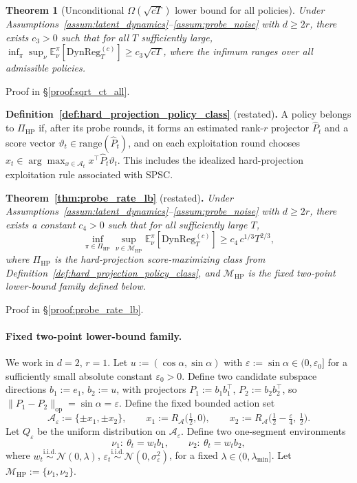 \documentclass{article}
\newcommand{\E}{\mathbb{E}}
\newcommand{\op}{\mathrm{op}}
\newcommand{\cA}{\mathcal{A}}
\newcommand{\DynReg}{\mathrm{DynReg}}
\newcommand{\range}{\mathrm{range}}
\newtheorem{theorem}{Theorem}
\begin{document}
\begin{theorem}[Unconditional $\Omega(\sqrt{cT})$ lower bound for all policies]
\label{thm:sqrt_ct_all}
Under Assumptions~\ref{assum:latent_dynamics}--\ref{assum:probe_noise} with $d \ge 2r$, there exists $c_3 > 0$ such that for all $T$ sufficiently large,
$\inf_\pi \sup_\nu \E_\nu^\pi[\DynReg_T^{(c)}] \ge c_3\sqrt{cT}$,
where the infimum ranges over all admissible policies.
\end{theorem}

Proof in \S\ref{proof:sqrt_ct_all}.

\noindent\textbf{Definition~\ref{def:hard_projection_policy_class}} (restated)\textbf{.}
A policy belongs to $\Pi_{\mathrm{HP}}$ if, after its probe rounds, it forms an estimated rank-$r$ projector $\widehat{P}_t$ and a score vector $\vartheta_t \in \range(\widehat{P}_t)$, and on each exploitation round chooses
$x_t \in \arg\max_{x \in \cA_t} x^\top \widehat{P}_t \vartheta_t$.
This includes the idealized hard-projection exploitation rule associated with SPSC.

\medskip
\noindent\textbf{Theorem~\ref{thm:probe_rate_lb}} (restated)\textbf{.}
\textit{Under Assumptions~\ref{assum:latent_dynamics}--\ref{assum:probe_noise} with $d \ge 2r$, there exists a constant $c_4 > 0$ such that for all sufficiently large $T$,}
\[
\inf_{\pi \in \Pi_{\mathrm{HP}}}
\sup_{\nu \in \mathcal{M}_{\mathrm{HP}}}
\E_\nu^\pi\!\left[\DynReg_T^{(c)}\right]
\ge c_4\, c^{1/3} T^{2/3},
\]
\textit{where $\Pi_{\mathrm{HP}}$ is the hard-projection score-maximizing class from Definition~\ref{def:hard_projection_policy_class}, and $\mathcal{M}_{\mathrm{HP}}$ is the fixed two-point lower-bound family defined below.}

Proof in \S\ref{proof:probe_rate_lb}.

\paragraph{Fixed two-point lower-bound family.}
We work in $d = 2$, $r = 1$.  Let $u := (\cos\alpha, \sin\alpha)$ with $\varepsilon := \sin\alpha \in (0, \varepsilon_0]$ for a sufficiently small absolute constant $\varepsilon_0 > 0$.
Define two candidate subspace directions $b_1 := e_1$, $b_2 := u$, with projectors $P_1 := b_1 b_1^\top$, $P_2 := b_2 b_2^\top$, so $\|P_1 - P_2\|_{\op} = \sin\alpha = \varepsilon$.
Define the fixed bounded action set
\[
\cA_\varepsilon := \{\pm x_1, \pm x_2\}, \qquad x_1 := R_{\cA}\bigl(\tfrac{1}{2}, 0\bigr), \qquad x_2 := R_{\cA}\bigl(\tfrac{1}{2} - \tfrac{\varepsilon}{4},\, \tfrac{1}{2}\bigr).
\]
Let $Q_\varepsilon$ be the uniform distribution on $\cA_\varepsilon$.
Define two one-segment environments
\[
\nu_1:\ \theta_t = w_t b_1, \qquad \nu_2:\ \theta_t = w_t b_2,
\]
where $w_t \stackrel{\mathrm{i.i.d.}}{\sim} \mathcal{N}(0, \lambda)$, $\varepsilon_t \stackrel{\mathrm{i.i.d.}}{\sim} \mathcal{N}(0, \sigma_\varepsilon^2)$, for a fixed $\lambda \in (0, \lambda_{\min}]$.
Let $\mathcal{M}_{\mathrm{HP}} := \{\nu_1, \nu_2\}$.
\end{document}
